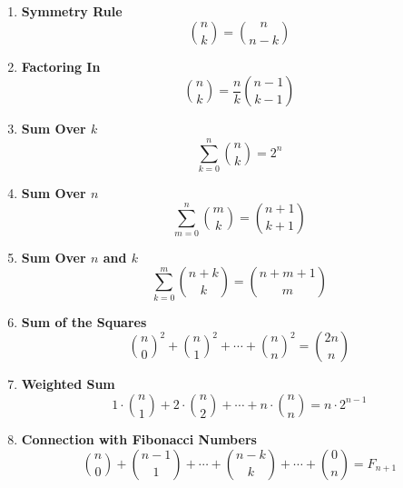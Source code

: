 \begin{enumerate}[leftmargin=*]
    \item \textbf{Symmetry Rule}
        \[\binom{n}{k} = \binom{n}{n - k}\]
    
    \item \textbf{Factoring In}
        \[\binom{n}{k} = \frac{n}{k} \binom{n - 1}{k - 1}\]
    
    \item \textbf{Sum Over $k$}
        \[\sum_{k = 0}^{n} \binom{n}{k} = 2^n\]
    
    \item \textbf{Sum Over $n$}
        \[\sum_{m = 0}^{n} \binom{m}{k} = \binom{n + 1}{k + 1}\]
    
    \item \textbf{Sum Over $n$ and $k$}
        \[\sum_{k = 0}^{m} \binom{n + k}{k} = \binom{n + m + 1}{m}\]
    
    \item \textbf{Sum of the Squares}
        \[\binom{n}{0}^2 + \binom{n}{1}^2 + \cdots + \binom{n}{n}^2 = \binom{2n}{n}\]
    
    \item \textbf{Weighted Sum}
        \[1 \cdot \binom{n}{1} + 2 \cdot \binom{n}{2} + \cdots + n \cdot \binom{n}{n} = n \cdot 2^{n - 1}\]
    
    \item \textbf{Connection with Fibonacci Numbers}
        \[\binom{n}{0} + \binom{n - 1}{1} + \cdots + \binom{n - k}{k} + \cdots + \binom{0}{n} = F_{n + 1}\]
\end{enumerate}